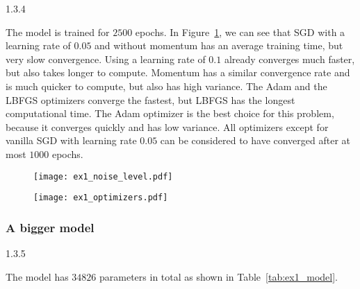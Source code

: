 \begin{task}{1.3.4}
\end{task}

The model is trained for $2500$ epochs. In Figure~\ref{fig:ex1_optimizers}, we can see that SGD with
a learning rate of $0.05$ and without momentum has an average training time, but very slow
convergence. Using a learning rate of $0.1$ already converges much faster, but also takes longer to
compute. Momentum has a similar convergence rate and is much quicker to compute, but also has high
variance. The Adam and the LBFGS optimizers converge the fastest, but LBFGS has the longest
computational time. The Adam optimizer is the best choice for this problem, because it converges
quickly and has low variance. All optimizers except for vanilla SGD with learning rate $0.05$ can
be considered to have converged after at most $1000$ epochs.

\begin{figure}[ht!]
  \centering
  \begin{minipage}{0.48\textwidth}
    \centering
    \texttt{[image: ex1\_noise\_level.pdf]}
    \label{fig:ex1_noise_level}
  \end{minipage}
  \begin{minipage}{0.48\textwidth}
    \centering
    \texttt{[image: ex1\_optimizers.pdf]}
    \label{fig:ex1_optimizers}
  \end{minipage}
\end{figure}


\subsubsection*{A bigger model}
\begin{task}{1.3.5}
\end{task}

The model has $34826$ parameters in total as shown in Table~\ref{tab:ex1_model}.

